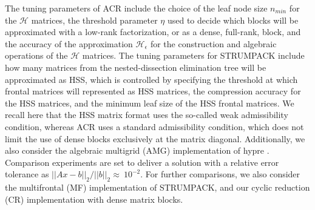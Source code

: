 \documentclass[]{elsarticle}
\begin{document}
The tuning parameters of ACR include the choice of the leaf node size $n_{min}$ for the $\mathcal{H}$ matrices, the threshold parameter $\eta$ used to decide which blocks will be approximated with a low-rank factorization, or as a dense, full-rank, block, and the accuracy of the approximation $\mathcal{H}_{\epsilon}$ for the construction and algebraic operations of the $\mathcal{H}$ matrices. The tuning parameters for STRUMPACK include how many matrices from the nested-dissection elimination tree will be approximated as HSS, which is controlled by specifying the threshold at which frontal matrices will represented as HSS matrices, the compression accuracy for the HSS matrices, and the minimum leaf size of the HSS frontal matrices. We recall here that the HSS matrix format uses the so-called weak admissibility condition, whereas ACR uses a standard admissibility condition, which does not limit the use of dense blocks exclusively at the matrix diagonal. Additionally, we also consider the algebraic multigrid (AMG) implementation of hypre \cite{Briggs00, hypre_web_page}. Comparison experiments are set to deliver a solution with a relative error tolerance as ${\left|\left|Ax-b\right|\right|_2}/{\left|\left| b \right|\right|_2}\approx~10^{-2}$. For further comparisons, we also consider the multifrontal (MF) implementation of STRUMPACK, and our cyclic reduction (CR) implementation with dense matrix blocks.
\end{document}
